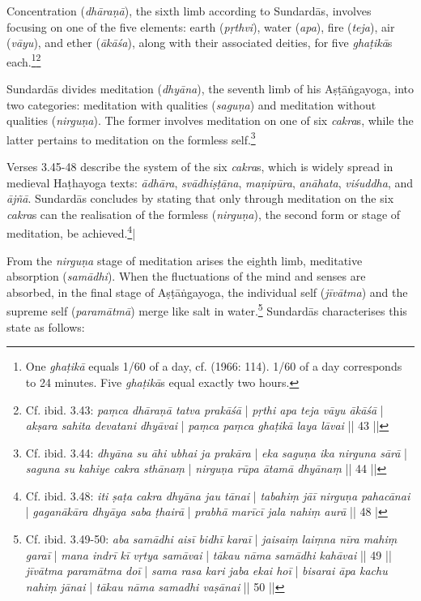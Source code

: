 Concentration (\textit{dhāraṇā}), the sixth limb according to Sundardās, involves focusing on one of the five elements: earth (\textit{pṛthvi}), water (\textit{apa}), fire (\textit{teja}), air (\textit{vāyu}), and ether (\textit{ākāśa}), along with their associated deities, for five \textit{ghaṭikā}s each.\footnote{One \textit{ghaṭikā} equals 1/60 of a day, cf. \citeauthor{sircar1966} (1966: 114). 1/60 of a day corresponds to 24 minutes. Five \textit{ghaṭikā}s equal exactly two hours.}\footnote{Cf. ibid. 3.43: \textit{paṃca dhāraṇā tatva prakāśā} | \textit{pṛthi apa teja vāyu ākāśā} | \textit{akṣara sahita devatani dhyāvai} | \textit{paṃca paṃca ghaṭikā laya lāvai} || 43 ||}

Sundardās divides meditation (\textit{dhyāna}), the seventh limb of his Aṣṭāṅgayoga, into two categories: meditation with qualities (\textit{saguṇa}) and meditation without qualities (\textit{nirguṇa}). The former involves meditation on one of six \textit{cakra}s, while the latter pertains to meditation on the formless self.\footnote{Cf. ibid. 3.44: \textit{dhyāna su āhi ubhai ja prakāra} | \textit{eka saguṇa ika nirguna sārā} | \textit{saguna su kahiye cakra sthānaṃ} | \textit{nirguṇa rūpa ātamā dhyānaṃ} || 44 ||}

Verses 3.45-48 describe the system of the six \textit{cakra}s, which is widely spread in medieval Haṭhayoga texts: \textit{ādhāra}, \textit{svādhiṣṭāna}, \textit{maṇipūra}, \textit{anāhata}, \textit{viśuddha}, and \textit{ājñā}. Sundardās concludes by stating that only through meditation on the six \textit{cakra}s can the realisation of the formless (\textit{nirguṇa}), the second form or stage of meditation, be achieved.\footnote{Cf. ibid. 3.48: \textit{iti ṣaṭa cakra dhyāna jau tānai} | \textit{tabahiṃ jāī nirguṇa pahacānai} | \textit{gaganākāra dhyāya saba ṭhairā} | \textit{prabhā marīcī jala nahiṃ aurā} || 48 |}|

From the \textit{nirguṇa} stage of meditation arises the eighth limb, meditative absorption (\textit{samādhi}). When the fluctuations of the mind and senses are absorbed, in the final stage of Aṣṭāṅgayoga, the individual self (\textit{jīvātma}) and the supreme self (\textit{paramātmā}) merge like salt in water.\footnote{Cf. ibid. 3.49-50: \textit{aba samādhi aisī bidhī karaī} | \textit{jaisaiṃ laiṃna nīra mahiṃ garaī} | \textit{mana indrī kī vṛtya samāvai} | \textit{tākau nāma samādhi kahāvai} || 49 || \textit{jīvātma paramātma doī} | \textit{sama rasa kari jaba ekai hoī} | \textit{bisarai āpa kachu nahiṃ jānai} | \textit{tākau nāma samadhi vaṣānai} || 50 ||} Sundardās characterises this state as follows:


